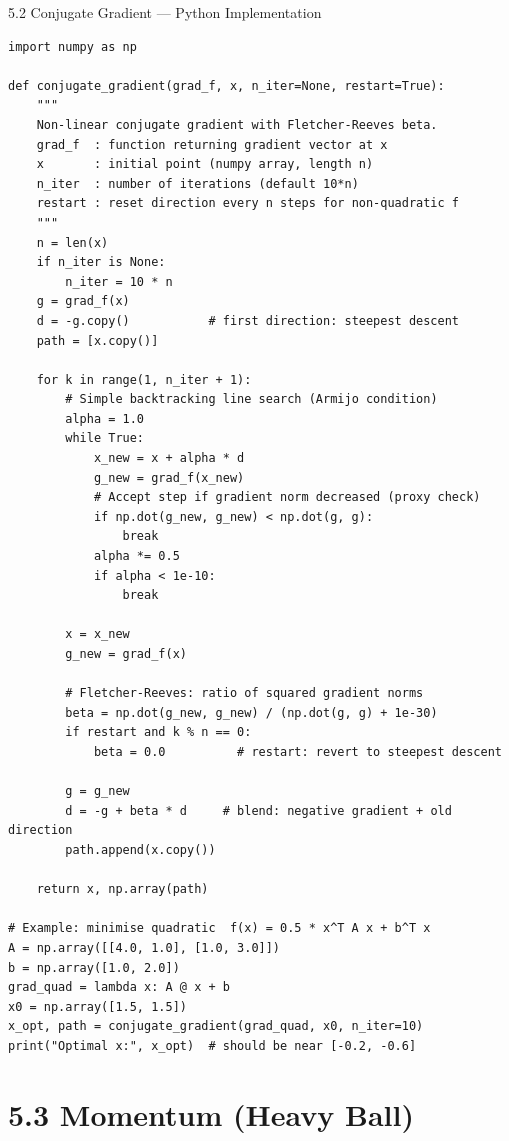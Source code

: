\documentclass[aspectratio=169,10pt]{beamer}
\begin{document}
\begin{frame}[fragile]{5.2 Conjugate Gradient --- Python Implementation}
\begin{lstlisting}[caption={Conjugate Gradient with Fletcher-Reeves Beta (Python/NumPy)}]
import numpy as np

def conjugate_gradient(grad_f, x, n_iter=None, restart=True):
    """
    Non-linear conjugate gradient with Fletcher-Reeves beta.
    grad_f  : function returning gradient vector at x
    x       : initial point (numpy array, length n)
    n_iter  : number of iterations (default 10*n)
    restart : reset direction every n steps for non-quadratic f
    """
    n = len(x)
    if n_iter is None:
        n_iter = 10 * n
    g = grad_f(x)
    d = -g.copy()           # first direction: steepest descent
    path = [x.copy()]

    for k in range(1, n_iter + 1):
        # Simple backtracking line search (Armijo condition)
        alpha = 1.0
        while True:
            x_new = x + alpha * d
            g_new = grad_f(x_new)
            # Accept step if gradient norm decreased (proxy check)
            if np.dot(g_new, g_new) < np.dot(g, g):
                break
            alpha *= 0.5
            if alpha < 1e-10:
                break

        x = x_new
        g_new = grad_f(x)

        # Fletcher-Reeves: ratio of squared gradient norms
        beta = np.dot(g_new, g_new) / (np.dot(g, g) + 1e-30)
        if restart and k % n == 0:
            beta = 0.0          # restart: revert to steepest descent

        g = g_new
        d = -g + beta * d     # blend: negative gradient + old direction
        path.append(x.copy())

    return x, np.array(path)

# Example: minimise quadratic  f(x) = 0.5 * x^T A x + b^T x
A = np.array([[4.0, 1.0], [1.0, 3.0]])
b = np.array([1.0, 2.0])
grad_quad = lambda x: A @ x + b
x0 = np.array([1.5, 1.5])
x_opt, path = conjugate_gradient(grad_quad, x0, n_iter=10)
print("Optimal x:", x_opt)  # should be near [-0.2, -0.6]
\end{lstlisting}
\end{frame}

\section{5.3 Momentum (Heavy Ball)}
\end{document}

